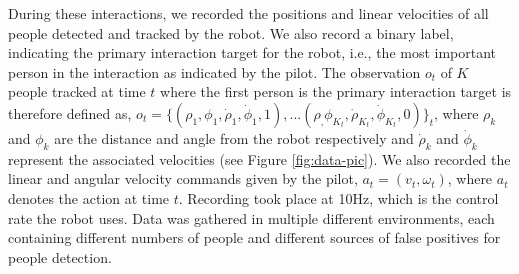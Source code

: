 \documentclass[letterpaper, 10 pt, conference]{ieeeconf}
\begin{document}
During these interactions, we recorded the positions and linear velocities of all people detected and tracked by the robot. We also record a binary label, indicating the primary interaction target for the robot, i.e., the most important person in the interaction as indicated by the pilot. The observation $o_t$ of $K$ people tracked at time $t$ where the first person is the primary interaction target is therefore defined as, $o_t = \{(\rho_1,\phi_1,\dot{\rho}_1,\dot{\phi}_1,1),... (\rho_,\phi_{K_t},\dot{\rho}_{K_t},\dot{\phi}_{K_t},0)\}_t$, where $\rho_k$ and $\phi_k$ are the distance and angle from the robot respectively and $\dot{\rho}_k$ and $\dot{\phi}_k$ represent the associated velocities (see Figure \ref{fig:data-pic}). We also recorded the linear and angular velocity commands given by the pilot, $a_t = (v_t,\omega_t)$, where $a_t$ denotes the action at time $t$. Recording took place at 10Hz, which is the control rate the robot uses.  Data was gathered in multiple different environments, each containing different numbers of people and different sources of false positives for people detection.
\end{document}
